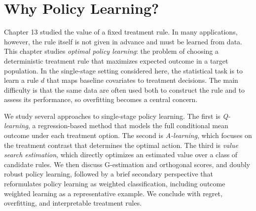 \documentclass[master.tex]{subfiles}
\begin{document}

\section{Why Policy Learning?}
\label{w14:sec:motivation}

Chapter 13 studied the value of a fixed treatment rule. In many applications, however, the rule itself is not given in advance and must be learned from data. This chapter studies \emph{optimal policy learning}: the problem of choosing a deterministic treatment rule that maximizes expected outcome in a target population. In the single-stage setting considered here, the statistical task is to learn a rule \(d\) that maps baseline covariates to treatment decisions. The main difficulty is that the same data are often used both to construct the rule and to assess its performance, so overfitting becomes a central concern.

We study several approaches to single-stage policy learning. The first is \emph{Q-learning}, a regression-based method that models the full conditional mean outcome under each treatment option. The second is \emph{A-learning}, which focuses on the treatment contrast that determines the optimal action. The third is \emph{value search estimation}, which directly optimizes an estimated value over a class of candidate rules. We then discuss G-estimation and orthogonal scores, and doubly robust policy learning, followed by a brief secondary perspective that reformulates policy learning as weighted classification, including outcome weighted learning as a representative example. We conclude with regret, overfitting, and interpretable treatment rules.
\end{document}
